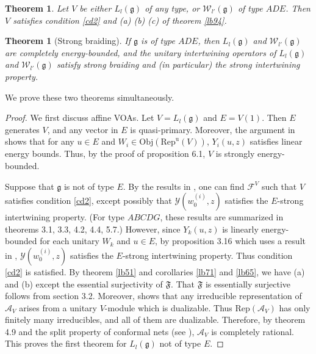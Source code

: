 \documentclass[12pt,a4paper]{article}
\theoremstyle{definition}
\theoremstyle{plain}
\newtheorem{thm}[df]{Theorem}
\newcommand{\fk}{\mathfrak}
\newcommand{\mc}{\mathcal}
\newcommand{\Rep}{\mathrm{Rep}}
\newcommand{\gk}{\mathfrak g}
\newcommand{\RepuV}{\mathrm{Rep}^{\mathrm u}(V)}
\newcommand{\Obj}{\mathrm{Obj}}
\numberwithin{equation}{subsection}
\begin{document}
\begin{thm}\label{lb81}
Let $V$ be either $L_l(\gk)$  of any type, or $\mc W_{l'}(\gk)$ of type $ADE$. Then $V$ satisfies condition \ref{cd2} and (a) (b) (c) of theorem \ref{lb94}.
\end{thm}


\begin{thm}[Strong braiding]\label{lb82}
If $\gk$ is of type $ADE$, then $L_l(\gk)$ and $\mc W_{l'}(\gk)$ are completely energy-bounded, and the unitary intertwining operators of $L_l(\gk)$ and $\mc W_{l'}(\gk)$ satisfy  strong braiding and (in particular) the strong intertwining property. 
\end{thm}

We prove these two theorems simultaneously.


\begin{proof}
We first discuss affine VOAs. Let $V=L_l(\gk)$ and $E=V(1)$. Then $E$ generates $V$, and any vector in $E$ is quasi-primary. Moreover, the argument in \cite{BS90} shows that for any $u\in E$ and $W_i\in\Obj(\RepuV)$, $Y_i(u,z)$ satisfies linear energy bounds. Thus, by the proof of \cite{CKLW18} proposition 6.1, $V$ is strongly energy-bounded.



Suppose that $\gk$ is not of type $E$. By the results in \cite{Was98,TL04,Gui19c,Gui20b},  one can find $\mc F^V$ such that $V$  satisfies  condition \ref{cd2}, except possibly that $\mc Y(w^{(i)}_0,z)$ satisfies the $E$-strong intertwining property.  (For type $ABCDG$, these results are summarized in \cite{Gui19c} theorems 3.1, 3.3, 4.2, 4.4, 5.7.) However, since $Y_k(u,z)$ is linearly energy-bounded for each unitary $W_k$ and $u\in E$, by \cite{Gui19a} proposition 3.16 which uses a result in \cite{TL99}, $\mc Y(w^{(i)}_0,z)$ satisfies the $E$-strong intertwining property. Thus condition \ref{cd2} is satisfied. By theorem \ref{lb51} and corollaries \ref{lb71} and \ref{lb65}, we have (a) and (b)  except the essential surjectivity of $\fk F$. That $\fk F$ is essentially surjective follows from \cite{Hen19} section 3.2. Moreover, \cite{Hen19} shows that any irreducible representation of $\mc A_V$ arises from a unitary $V$-module which is dualizable. Thus $\Rep(\mc A_V)$ has only finitely many irreducibles, and all of them are dualizable. Therefore, by \cite{LX04} theorem 4.9 and the split property of conformal nets (see \cite{MTW18}), $\mc A_V$ is completely rational. This proves the first theorem for $L_l(\gk)$ not of type $E$.



\end{proof}
\end{document}
